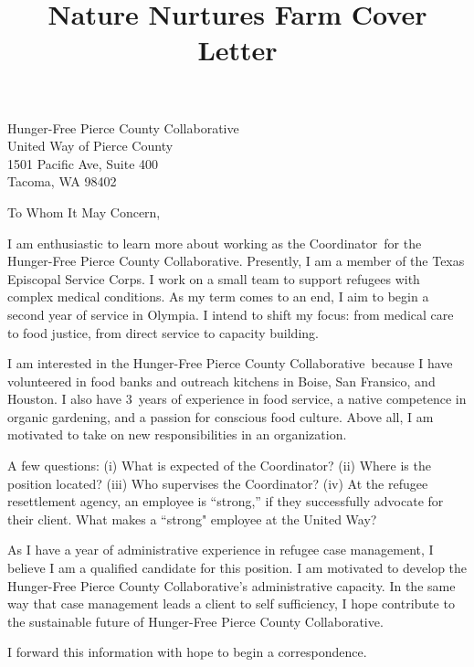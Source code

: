 \documentclass{letter}
\title{Nature Nurtures Farm Cover Letter}
\newcommand{\jobtitle}{Coordinator}
\newcommand{\company}{Hunger-Free Pierce County Collaborative}
\begin{document}
\begin{letter}{Hunger-Free Pierce County Collaborative \\ United Way of Pierce County \\ 1501 Pacific Ave, Suite 400 \\ Tacoma, WA 98402}
\opening{To Whom It May Concern,}

I am enthusiastic to learn more about working as the \jobtitle\ for the \company. Presently, I am a member of the Texas Episcopal Service Corps. I work on a small team to support refugees with complex medical conditions. As my term comes to an end, I aim to begin a second year of service in Olympia. I intend to shift my focus: from medical care to food justice, from direct service to capacity building. 

I am interested in the \company\ because I have volunteered in food banks and outreach kitchens in Boise, San Fransico, and Houston. I also have 3~years of experience in food service, a native competence in organic gardening, and a passion for conscious food culture. Above all, I am motivated to take on new responsibilities in an organization.  

A few questions: (i) What is expected of the \jobtitle? (ii) Where is the position located? (iii) Who supervises the \jobtitle? (iv) At the refugee resettlement agency, an employee is ``strong,'' if they successfully advocate for their client. What makes a ``strong" employee at the United Way? 

As I have a year of administrative experience in refugee case management, I believe I am a qualified candidate for this position. I am motivated to develop the \company's administrative capacity. In the same way that case management leads a client to self sufficiency, I hope contribute to the sustainable future of \company. 

I forward this information with hope to begin a correspondence.




\end{letter}
\end{document}
